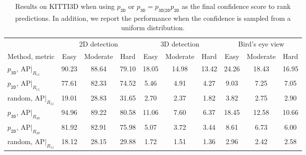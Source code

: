 \documentclass[10pt,twocolumn,letterpaper]{article}
\begin{document}
\begin{table*}[th]
    \centering
    {\footnotesize
    \begin{tabular}{l|ccc|ccc|ccc}
        \toprule
        & \multicolumn{3}{c|}{2D detection} & \multicolumn{3}{c|}{3D detection} & \multicolumn{3}{c}{Bird's eye view} \\
        Method, metric & Easy & Moderate & Hard & Easy & Moderate & Hard & Easy & Moderate & Hard \\
        \midrule
	$p_\mathtt{3D}$, $\text{AP}|_{R_{11}}$ & 90.23 & 88.64 & 79.10 & 18.05 & 14.98 & 13.42 & 24.26 & 18.43 & 16.95 \\
	$p_\mathtt{2D}$, $\text{AP}|_{R_{11}}$ & 77.61 & 82.33 & 74.52 & 5.46 & 4.91 & 4.27 & 9.03 & 7.25 & 7.05 \\
	random, $\text{AP}|_{R_{11}}$ & 19.01 & 28.83 & 31.65 & 2.70 & 2.37 & 1.82 & 3.82 & 2.75 & 2.90 \\
        \midrule
	$p_\mathtt{3D}$, $\text{AP}|_{R_{40}}$ & 94.96 & 89.22 & 80.58 & 11.06 & 7.60 & 6.37 & 18.45 & 12.58 & 10.66 \\
	$p_\mathtt{2D}$, $\text{AP}|_{R_{40}}$ & 81.92 & 82.91 & 75.98 & 5.07 & 3.72 & 3.44 & 8.61 & 6.73 & 6.00 \\
	random, $\text{AP}|_{R_{11}}$ & 18.12 & 28.15 & 29.88 & 1.72 & 1.51 & 1.36 & 2.96 & 2.42 & 2.58 \\
        \bottomrule
    \end{tabular}}
    \caption{Results on KITTI3D when using $p_\mathtt{2D}$ or $p_\mathtt{3D}=p_\mathtt{3D|2D}p_\mathtt{2D}$ as the final confidence score to rank predictions. In addition, we report the performance when the confidence is sampled from a uniform distribution.}
    \label{tab:conf-2d}
    \vspace{-12pt}
\end{table*}
\end{document}
